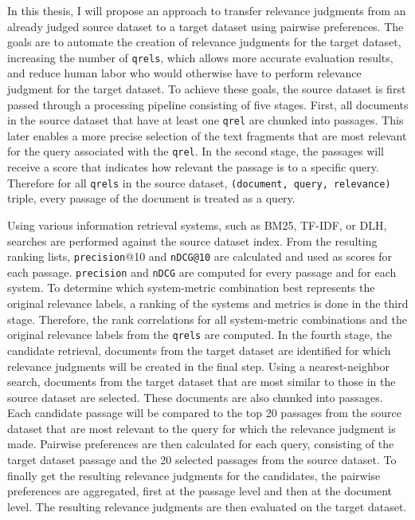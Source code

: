 In this thesis, I will propose an approach to transfer relevance judgments from an already judged source dataset to a target dataset using pairwise preferences. The goals are to automate the creation of relevance judgments for the target dataset, increasing the number of \texttt{qrels}, which allows more accurate evaluation results, and reduce human labor who would otherwise have to perform relevance judgment for the target dataset. To achieve these goals, the source dataset is first passed through a processing pipeline consisting of five stages. First, all documents in the source dataset that have at least one \texttt{qrel} are chunked into passages. This later enables a more precise selection of the text fragments that are most relevant for the query associated with the \texttt{qrel}. In the second stage, the passages will receive a score that indicates how relevant the passage is to a specific query. Therefore for all \texttt{qrels} in the source dataset, \texttt{(document, query, relevance)} triple, every passage of the document is treated as a query.

Using various information retrieval systems, such as BM25, TF-IDF, or DLH, searches are performed against the source dataset index. From the resulting ranking lists, \texttt{precision}@10 and \texttt{nDCG@10} are calculated and used as scores for each passage. \texttt{precision} and \texttt{nDCG} are computed for every passage and for each system. To determine which system-metric combination best represents the original relevance labels, a ranking of the systems and metrics is done in the third stage. Therefore, the rank correlations for all system-metric combinations and the original relevance labels from the \texttt{qrels} are computed. In the fourth stage, the candidate retrieval, documents from the target dataset are identified for which relevance judgments will be created in the final step. Using a nearest-neighbor search, documents from the target dataset that are most similar to those in the source dataset are selected. These documents are also chunked into passages. Each candidate passage will be compared to the top 20 passages from the source dataset that are most relevant to the query for which the relevance judgment is made. Pairwise preferences are then calculated for each query, consisting of the target dataset passage and the 20 selected passages from the source dataset. To finally get the resulting relevance judgments for the candidates, the pairwise preferences are aggregated, first at the passage level and then at the document level. The resulting relevance judgments are then evaluated on the target dataset.